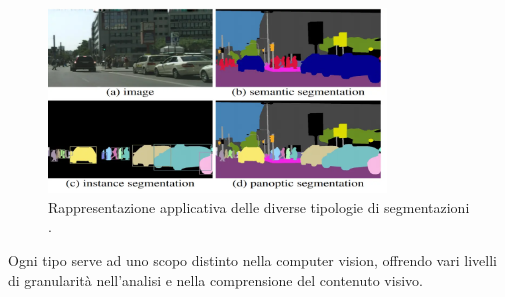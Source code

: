 \begin{figure}[H]
    \centering
    \includegraphics[width=0.8\textwidth]{Immagini/Generiche/semantic_vs_instance_vs_panoptic.png}
    \caption{Rappresentazione applicativa delle diverse tipologie di segmentazioni \cite{ImageSegmentation_Labeller}.}

\end{figure}

Ogni tipo serve ad uno scopo distinto nella computer vision, offrendo vari livelli di granularità 
nell'analisi e nella comprensione del contenuto visivo.
\newpage



